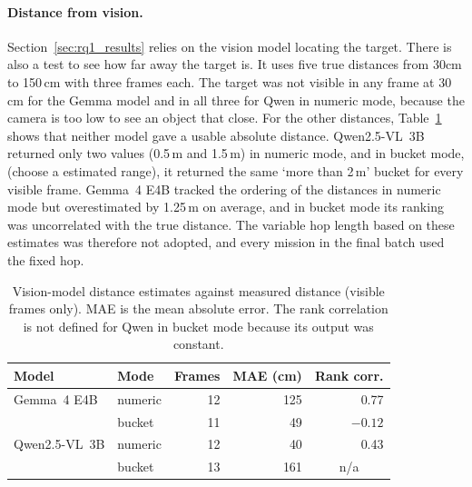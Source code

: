 \paragraph{Distance from vision.} Section~\ref{sec:rq1_results} relies on the 
vision model locating the target. There is also a test to see how far away the target is.  
It uses five true distances from 30cm to 150\,cm with three frames each. The target was not visible 
in any frame at 30\,cm for the Gemma model and in all three for Qwen in numeric mode, 
because the camera is too low to see an object that close. For the other distances, 
Table~\ref{tab:f9} shows that neither model gave a usable absolute distance. 
Qwen2.5-VL~3B returned only two values (0.5\,m and 1.5\,m) in numeric mode, 
and in bucket mode, (choose a estimated range), it returned the same `more than 2\,m' bucket for every visible frame. 
Gemma~4 E4B tracked the ordering of the distances in numeric mode but overestimated by 1.25\,m on average, 
and in bucket mode its ranking was uncorrelated with the true distance. 
The variable hop length based on these estimates was therefore not adopted, and every mission in the final batch used the fixed hop.

\begin{table}[htbp]
    \centering
    \caption{Vision-model distance estimates against measured distance (visible frames
    only). MAE is the mean absolute error. The rank correlation is not defined for
    Qwen in bucket mode because its output was constant.}
    \label{tab:f9}
    \small
    \begin{tabular}{llrrr}
        \toprule
        Model & Mode & Frames & MAE (cm) & Rank corr. \\
        \midrule
        Gemma~4 E4B   & numeric & 12 & 125 & \phantom{$-$}0.77 \\
                      & bucket  & 11 &  49 & $-0.12$ \\
        \addlinespace
        Qwen2.5-VL~3B & numeric & 12 &  40 & \phantom{$-$}0.43 \\
                      & bucket  & 13 & 161 & \multicolumn{1}{c}{n/a} \\
        \bottomrule
    \end{tabular}
\end{table}





\label{sec:rq2_results}

